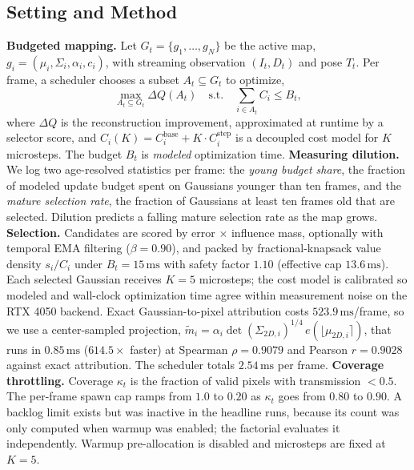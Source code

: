\subsection{Setting and Method}
\textbf{Budgeted mapping.}
Let $G_t = \{g_1, \dots, g_N\}$ be the active map, $g_i = (\mu_i, \Sigma_i, \alpha_i, c_i)$, with streaming observation $(I_t, D_t)$ and pose $T_t$.
Per frame, a scheduler chooses a subset $A_t \subseteq G_t$ to optimize,
\begin{equation}
\max_{A_t \subseteq G_t} \Delta Q(A_t) \quad \text{s.t.} \quad \sum_{i \in A_t} C_i \le B_t,
\end{equation}
where $\Delta Q$ is the reconstruction improvement, approximated at runtime by a selector score, and $C_i(K) = C_i^{\mathrm{base}} + K \cdot C_i^{\mathrm{step}}$ is a decoupled cost model for $K$ microsteps.
The budget $B_t$ is \emph{modeled} optimization time.
\textbf{Measuring dilution.}
We log two age-resolved statistics per frame: the \emph{young budget share}, the fraction of modeled update budget spent on Gaussians younger than ten frames, and the \emph{mature selection rate}, the fraction of Gaussians at least ten frames old that are selected.
Dilution predicts a falling mature selection rate as the map grows.
\textbf{Selection.}
Candidates are scored by error $\times$ influence mass, optionally with temporal EMA filtering ($\beta = 0.90$), and packed by fractional-knapsack value density $s_i / C_i$ under $B_t = 15\,\mathrm{ms}$ with safety factor $1.10$ (effective cap $13.6\,\mathrm{ms}$).
Each selected Gaussian receives $K = 5$ microsteps; the cost model is calibrated so modeled and wall-clock optimization time agree within measurement noise on the RTX 4050 backend.
Exact Gaussian-to-pixel attribution costs $523.9\,\mathrm{ms}$/frame, so we use a center-sampled projection, $\tilde{m}_i = \alpha_i \det(\Sigma_{2D,i})^{1/4}\, e(\lfloor \mu_{2D,i} \rceil)$, that runs in $0.85\,\mathrm{ms}$ ($614.5\times$ faster) at Spearman $\rho = 0.9079$ and Pearson $r = 0.9028$ against exact attribution. The scheduler totals $2.54\,\mathrm{ms}$ per frame.
\textbf{Coverage throttling.}
Coverage $\kappa_t$ is the fraction of valid pixels with transmission $< 0.5$.
The per-frame spawn cap ramps from $1.0$ to $0.20$ as $\kappa_t$ goes from $0.80$ to $0.90$.
A backlog limit exists but was inactive in the headline runs, because its count was only computed when warmup was enabled; the factorial evaluates it independently.
Warmup pre-allocation is disabled and microsteps are fixed at $K = 5$.


